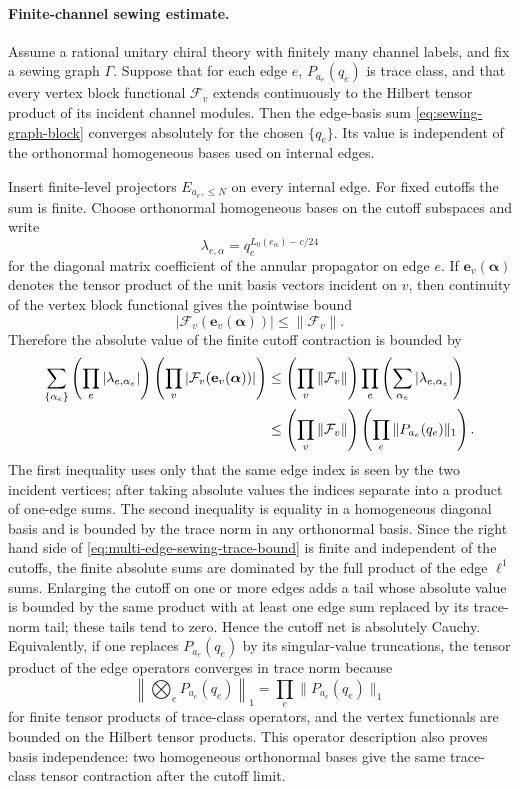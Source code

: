 \paragraph{Finite-channel sewing estimate.}
Assume a rational unitary chiral theory with finitely many channel labels,
and fix a sewing graph \(\Gamma\).  Suppose that for each edge \(e\),
\(P_{a_e}(q_e)\) is trace class, and that every vertex block functional
\(\mathcal F_v\) extends continuously to the Hilbert tensor product of its
incident channel modules.  Then the edge-basis sum
\eqref{eq:sewing-graph-block} converges absolutely for the chosen
\(\{q_e\}\).  Its value is independent of the orthonormal homogeneous bases
used on internal edges.

Insert finite-level projectors \(E_{a_e,\le N}\) on every internal edge.  For
fixed cutoffs the sum is finite.  Choose orthonormal homogeneous bases on the
cutoff subspaces and write
\[
  \lambda_{e,\alpha}
  =
  q_e^{L_0(e_{\alpha})-c/24}
\]
for the diagonal matrix coefficient of the annular propagator on edge \(e\).
If \(\mathbf e_v(\boldsymbol\alpha)\) denotes the tensor product of the
unit basis vectors incident on \(v\), then continuity of the vertex block
functional gives the pointwise bound
\[
  \left|
    \mathcal F_v(\mathbf e_v(\boldsymbol\alpha))
  \right|
  \le
  \|\mathcal F_v\| .
\]
Therefore the absolute value of the finite cutoff contraction is bounded by
\begin{align}
  \sum_{\{\alpha_e\}}
  \left(
    \prod_e |\lambda_{e,\alpha_e}|
  \right)
  \left(
    \prod_v
    \left|
      \mathcal F_v(\mathbf e_v(\boldsymbol\alpha))
    \right|
  \right)
  &\le
  \left(\prod_v \|\mathcal F_v\|\right)
  \prod_e
  \left(\sum_{\alpha_e}|\lambda_{e,\alpha_e}|\right)       \notag\\
  &\le
  \left(\prod_v \|\mathcal F_v\|\right)
  \left(\prod_e \|P_{a_e}(q_e)\|_1\right).
  \label{eq:multi-edge-sewing-trace-bound}
\end{align}
The first inequality uses only that the same edge index is seen by the two
incident vertices; after taking absolute values the indices separate into a
product of one-edge sums.  The second inequality is equality in a homogeneous
diagonal basis and is bounded by the trace norm in any orthonormal basis.
Since the right hand side of
\eqref{eq:multi-edge-sewing-trace-bound} is finite and independent of the
cutoffs, the finite absolute sums are dominated by the full product of the
edge \(\ell^1\) sums.  Enlarging the cutoff on one or more edges adds a tail
whose absolute value is bounded by the same product with at least one edge
sum replaced by its trace-norm tail; these tails tend to zero.  Hence the
cutoff net is absolutely Cauchy.  Equivalently, if one replaces
\(P_{a_e}(q_e)\) by its singular-value truncations, the tensor product of the
edge operators converges in trace norm because
\[
  \left\|
    \bigotimes_{e} P_{a_e}(q_e)
  \right\|_1
  =
  \prod_e \|P_{a_e}(q_e)\|_1
\]
for finite tensor products of trace-class operators, and the vertex
functionals are bounded on the Hilbert tensor products.  This operator
description also proves basis independence: two homogeneous orthonormal
bases give the same trace-class tensor contraction after the cutoff limit.

